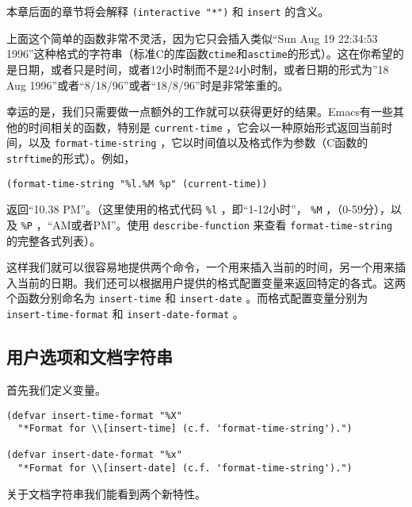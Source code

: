 本章后面的章节将会解释 \texttt{(interactive "*")} 和 \texttt{insert} 的含义。

上面这个简单的函数非常不灵活，因为它只会插入类似“Sun Aug 19 22:34:53 1996”这种格式的字符串（标准C的库函数\texttt{ctime}和\texttt{asctime}的形式）。这在你希望的是日期，或者只是时间，或者12小时制而不是24小时制，或者日期的形式为”18 Aug 1996”或者“8/18/96”或者“18/8/96”时是非常笨重的。

幸运的是，我们只需要做一点额外的工作就可以获得更好的结果。Emacs有一些其他的时间相关的函数，特别是 \texttt{current-time} ，它会以一种原始形式返回当前时间，以及 \texttt{format-time-string} ，它以时间值以及格式作为参数（C函数的\texttt{strftime}的形式）。例如，

\begin{verbatim}
(format-time-string "%l.%M %p" (current-time))
\end{verbatim}

返回“10.38 PM”。（这里使用的格式代码 \verb|%l| ，即“1-12小时”， \verb|%M| ，（0-59分），以及 \verb|%P| ，“AM或者PM”。使用 \texttt{describe-function} 来查看 \texttt{format-time-string} 的完整各式列表）。

这样我们就可以很容易地提供两个命令，一个用来插入当前的时间，另一个用来插入当前的日期。我们还可以根据用户提供的格式配置变量来返回特定的各式。这两个函数分别命名为 \texttt{insert-time} 和 \texttt{insert-date} 。而格式配置变量分别为 \texttt{insert-time-format} 和 \texttt{insert-date-format} 。

\subsection{用户选项和文档字符串}
\label{section:04-User-Options-and-Docstrings}

首先我们定义变量。

\begin{verbatim}
(defvar insert-time-format "%X"
  "*Format for \\[insert-time] (c.f. 'format-time-string').")

(defvar insert-date-format "%x"
  "*Format for \\[insert-date] (c.f. 'format-time-string').")
\end{verbatim}

关于文档字符串我们能看到两个新特性。

